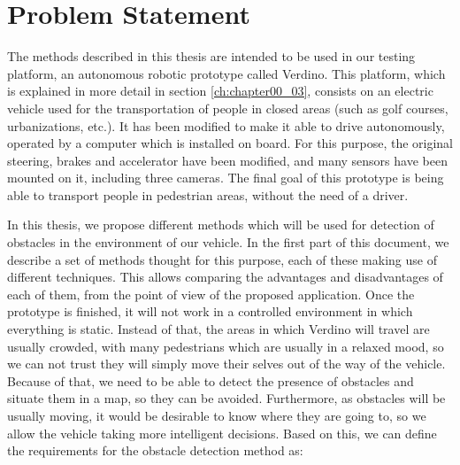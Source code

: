 \section{Problem Statement}\label{ch:chapter00_01}


The methods described in this thesis are intended to be used in our testing platform, an autonomous robotic prototype called Verdino. This platform, which is explained in more detail in section \ref{ch:chapter00_03}, consists on an electric vehicle used for the transportation of people in closed areas (such as golf courses, urbanizations, etc.). It has been modified to make it able to drive autonomously, operated by a computer which is installed on board. For this purpose, the original steering, brakes and accelerator have been modified, and many sensors have been mounted on it, including three cameras. The final goal of this prototype is being able to transport people in pedestrian areas, without the need of a driver.

In this thesis, we propose different methods which will be used for detection of obstacles in the environment of our vehicle. In the first part of this document, we describe a set of methods thought for this purpose, each of these making use of different techniques. This allows comparing the advantages and disadvantages of each of them, from the point of view of the proposed application. Once the prototype is finished, it will not work in a controlled environment in which everything is static. Instead of that, the areas in which Verdino will travel are usually crowded, with many pedestrians which are usually in a relaxed mood, so we can not trust they will simply move their selves out of the way of the vehicle. Because of that, we need to be able to detect the presence of obstacles and situate them in a map, so they can be avoided. Furthermore, as obstacles will be usually moving, it would be desirable to know where they are going to, so we allow the vehicle taking more intelligent decisions. Based on this, we can define the requirements for the obstacle detection method as:

